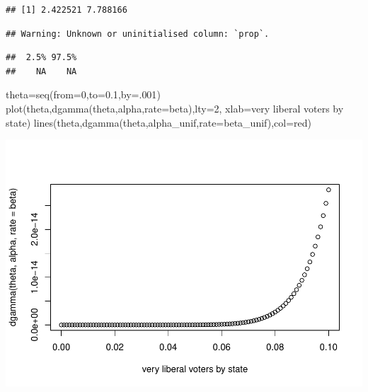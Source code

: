 \documentclass[
]{book}
\newenvironment{Shaded}{\begin{snugshade}}{\end{snugshade}}
\newcommand{\AttributeTok}[1]{\textcolor[rgb]{0.77,0.63,0.00}{#1}}
\newcommand{\DecValTok}[1]{\textcolor[rgb]{0.00,0.00,0.81}{#1}}
\newcommand{\FloatTok}[1]{\textcolor[rgb]{0.00,0.00,0.81}{#1}}
\newcommand{\FunctionTok}[1]{\textcolor[rgb]{0.00,0.00,0.00}{#1}}
\newcommand{\NormalTok}[1]{#1}
\newcommand{\OtherTok}[1]{\textcolor[rgb]{0.56,0.35,0.01}{#1}}
\newcommand{\SpecialCharTok}[1]{\textcolor[rgb]{0.00,0.00,0.00}{#1}}
\newcommand{\StringTok}[1]{\textcolor[rgb]{0.31,0.60,0.02}{#1}}
\theoremstyle{definition}
\theoremstyle{definition}
\theoremstyle{definition}
\theoremstyle{definition}
\theoremstyle{remark}
\begin{document}
\begin{verbatim}
## [1] 2.422521 7.788166
\end{verbatim}

\begin{Shaded}
\end{Shaded}

\begin{verbatim}
## Warning: Unknown or uninitialised column: `prop`.
\end{verbatim}

\begin{verbatim}
##  2.5% 97.5% 
##    NA    NA
\end{verbatim}

\begin{Shaded}
\begin{Highlighting}[]
\NormalTok{  theta}\OtherTok{=}\FunctionTok{seq}\NormalTok{(}\AttributeTok{from=}\DecValTok{0}\NormalTok{,}\AttributeTok{to=}\FloatTok{0.1}\NormalTok{,}\AttributeTok{by=}\NormalTok{.}\DecValTok{001}\NormalTok{)}
 \FunctionTok{plot}\NormalTok{(theta,}\FunctionTok{dgamma}\NormalTok{(theta,alpha,}\AttributeTok{rate=}\NormalTok{beta),}\AttributeTok{lty=}\DecValTok{2}\NormalTok{, }\AttributeTok{xlab=}\StringTok{\textquotesingle{}very liberal voters by state\textquotesingle{}}\NormalTok{)}
\FunctionTok{lines}\NormalTok{(theta,}\FunctionTok{dgamma}\NormalTok{(theta,alpha\_unif,}\AttributeTok{rate=}\NormalTok{beta\_unif),}\AttributeTok{col=}\StringTok{\textquotesingle{}red\textquotesingle{}}\NormalTok{)}
\end{Highlighting}
\end{Shaded}

\includegraphics{_main_files/figure-latex/unnamed-chunk-29-2.pdf}
\end{document}
